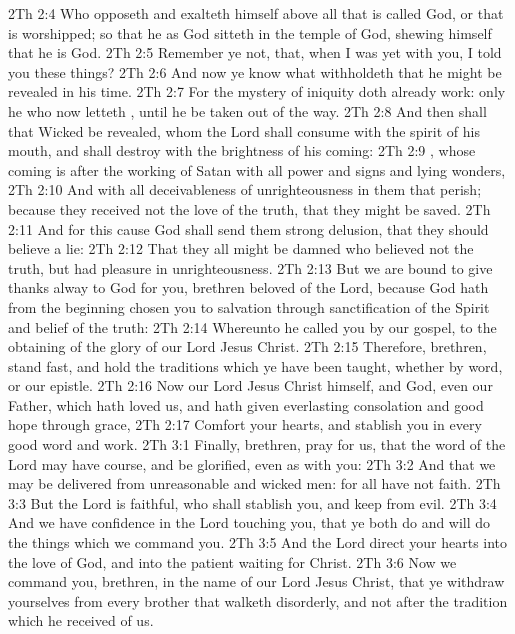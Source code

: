 \vs 2Th 2:4 Who opposeth and exalteth himself above all that is called God, or that is worshipped; so that he as God sitteth in the temple of God, shewing himself that he is God.
\vs 2Th 2:5 Remember ye not, that, when I was yet with you, I told you these things?
\vs 2Th 2:6 And now ye know what withholdeth that he might be revealed in his time.
\vs 2Th 2:7 For the mystery of iniquity doth already work: only he who now letteth , until he be taken out of the way.
\vs 2Th 2:8 And then shall that Wicked be revealed, whom the Lord shall consume with the spirit of his mouth, and shall destroy with the brightness of his coming:
\vs 2Th 2:9 , whose coming is after the working of Satan with all power and signs and lying wonders,
\vs 2Th 2:10 And with all deceivableness of unrighteousness in them that perish; because they received not the love of the truth, that they might be saved.
\vs 2Th 2:11 And for this cause God shall send them strong delusion, that they should believe a lie:
\vs 2Th 2:12 That they all might be damned who believed not the truth, but had pleasure in unrighteousness.
\vs 2Th 2:13 But we are bound to give thanks alway to God for you, brethren beloved of the Lord, because God hath from the beginning chosen you to salvation through sanctification of the Spirit and belief of the truth:
\vs 2Th 2:14 Whereunto he called you by our gospel, to the obtaining of the glory of our Lord Jesus Christ.
\vs 2Th 2:15 Therefore, brethren, stand fast, and hold the traditions which ye have been taught, whether by word, or our epistle.
\vs 2Th 2:16 Now our Lord Jesus Christ himself, and God, even our Father, which hath loved us, and hath given  everlasting consolation and good hope through grace,
\vs 2Th 2:17 Comfort your hearts, and stablish you in every good word and work.
\vs 2Th 3:1 Finally, brethren, pray for us, that the word of the Lord may have  course, and be glorified, even as  with you:
\vs 2Th 3:2 And that we may be delivered from unreasonable and wicked men: for all  have not faith.
\vs 2Th 3:3 But the Lord is faithful, who shall stablish you, and keep  from evil.
\vs 2Th 3:4 And we have confidence in the Lord touching you, that ye both do and will do the things which we command you.
\vs 2Th 3:5 And the Lord direct your hearts into the love of God, and into the patient waiting for Christ.
\vs 2Th 3:6 Now we command you, brethren, in the name of our Lord Jesus Christ, that ye withdraw yourselves from every brother that walketh disorderly, and not after the tradition which he received of us.
